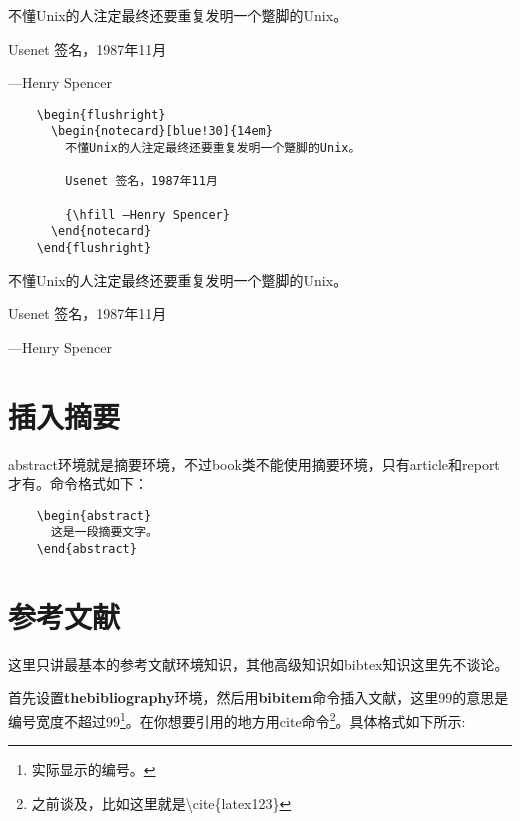 \documentclass[11pt,oneside]{book}
\begin{document}
  \begin{flushright}
    \begin{notecard}{14em}
      不懂Unix的人注定最终还要重复发明一个蹩脚的Unix。

      Usenet 签名，1987年11月

      {\hfill —Henry Spencer}
    \end{notecard}
  \end{flushright}


  \begin{Verbatim}
    \begin{flushright}
      \begin{notecard}[blue!30]{14em}
        不懂Unix的人注定最终还要重复发明一个蹩脚的Unix。

        Usenet 签名，1987年11月

        {\hfill —Henry Spencer}
      \end{notecard}
    \end{flushright}
  \end{Verbatim}

  \begin{flushright}
    \begin{notecard}[blue!30]{14em}
      不懂Unix的人注定最终还要重复发明一个蹩脚的Unix。

      Usenet 签名，1987年11月

      {\hfill —Henry Spencer}
    \end{notecard}
  \end{flushright}



  \chapter{插入摘要}
  abstract环境就是摘要环境，不过book类不能使用摘要环境，只有article和report才有。命令格式如下：
  \begin{Verbatim}
    \begin{abstract}
      这是一段摘要文字。
    \end{abstract}
  \end{Verbatim}



  \chapter{参考文献}
  这里只讲最基本的参考文献环境知识，其他高级知识如bibtex知识这里先不谈论。

  首先设置\textbf{thebibliography}环境，然后用\textbf{bibitem}命令插入文献，这里99的意思是编号宽度不超过99\footnote{实际显示的编号。}。在你想要引用的地方用cite命令\footnote{之前谈及，比如这里就是\textbackslash cite\{latex123\}}。具体格式如下所示:
\end{document}
